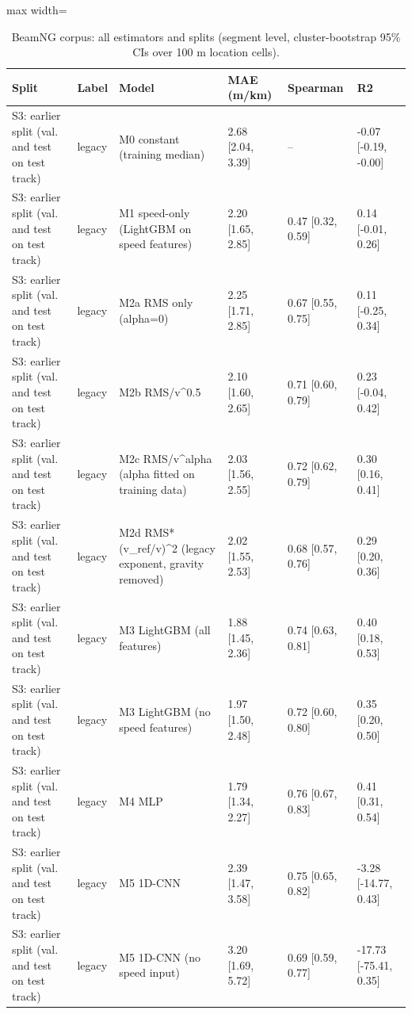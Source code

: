 \begin{table}[!htbp]
\centering
\scriptsize
\caption{BeamNG corpus: all estimators and splits (segment level, cluster-bootstrap 95\% CIs over 100 m location cells).}
\label{tab:s_beamng}
\begin{adjustbox}{max width=\columnwidth}
\begin{tabular}{>{\raggedright\arraybackslash}p{3.4cm}l>{\raggedright\arraybackslash}p{4.6cm}lll}
\toprule
\textbf{Split} & \textbf{Label} & \textbf{Model} & \textbf{MAE (m/km)} & \textbf{Spearman} & \textbf{R2} \\
\midrule
S3: earlier split (val. and test on test track) & legacy & M0 constant (training median) & 2.68 [2.04, 3.39] & -- & -0.07 [-0.19, -0.00] \\
S3: earlier split (val. and test on test track) & legacy & M1 speed-only (LightGBM on speed features) & 2.20 [1.65, 2.85] & 0.47 [0.32, 0.59] & 0.14 [-0.01, 0.26] \\
S3: earlier split (val. and test on test track) & legacy & M2a RMS only (alpha=0) & 2.25 [1.71, 2.85] & 0.67 [0.55, 0.75] & 0.11 [-0.25, 0.34] \\
S3: earlier split (val. and test on test track) & legacy & M2b RMS/v\textasciicircum{}0.5 & 2.10 [1.60, 2.65] & 0.71 [0.60, 0.79] & 0.23 [-0.04, 0.42] \\
S3: earlier split (val. and test on test track) & legacy & M2c RMS/v\textasciicircum{}alpha (alpha fitted on training data) & 2.03 [1.56, 2.55] & 0.72 [0.62, 0.79] & 0.30 [0.16, 0.41] \\
S3: earlier split (val. and test on test track) & legacy & M2d RMS*(v\_ref/v)\textasciicircum{}2 (legacy exponent, gravity removed) & 2.02 [1.55, 2.53] & 0.68 [0.57, 0.76] & 0.29 [0.20, 0.36] \\
S3: earlier split (val. and test on test track) & legacy & M3 LightGBM (all features) & 1.88 [1.45, 2.36] & 0.74 [0.63, 0.81] & 0.40 [0.18, 0.53] \\
S3: earlier split (val. and test on test track) & legacy & M3 LightGBM (no speed features) & 1.97 [1.50, 2.48] & 0.72 [0.60, 0.80] & 0.35 [0.20, 0.50] \\
S3: earlier split (val. and test on test track) & legacy & M4 MLP & 1.79 [1.34, 2.27] & 0.76 [0.67, 0.83] & 0.41 [0.31, 0.54] \\
S3: earlier split (val. and test on test track) & legacy & M5 1D-CNN & 2.39 [1.47, 3.58] & 0.75 [0.65, 0.82] & -3.28 [-14.77, 0.43] \\
S3: earlier split (val. and test on test track) & legacy & M5 1D-CNN (no speed input) & 3.20 [1.69, 5.72] & 0.69 [0.59, 0.77] & -17.73 [-75.41, 0.35] \\

\end{tabular}
\end{adjustbox}
\end{table}
